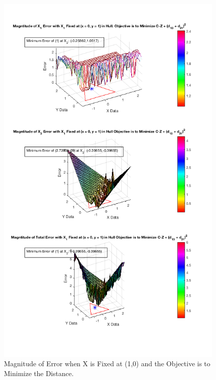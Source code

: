 \documentclass[answers]{exam}
\begin{document}
        \begin{figure}[H]
    \centering
    
        \caption{Magnitude of Error when X is Fixed at (1,0) and the Objective is to Minimize the Distance.}
    \includegraphics[scale=.7]{Problem8f5.png}
    \end{figure} 
    
\end{document}
